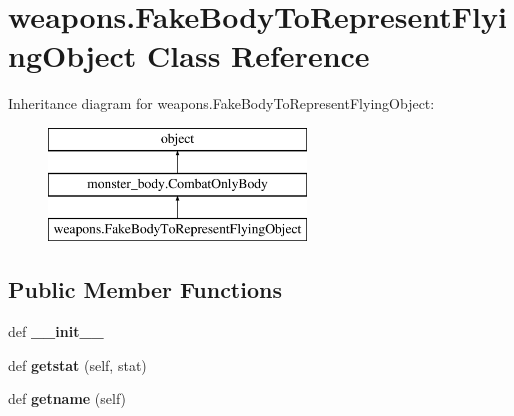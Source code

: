 \hypertarget{classweapons_1_1_fake_body_to_represent_flying_object}{}\section{weapons.\+Fake\+Body\+To\+Represent\+Flying\+Object Class Reference}
\label{classweapons_1_1_fake_body_to_represent_flying_object}
Inheritance diagram for weapons.\+Fake\+Body\+To\+Represent\+Flying\+Object\+:\begin{figure}[H]
\begin{center}
\leavevmode
\includegraphics[height=3.000000cm]{classweapons_1_1_fake_body_to_represent_flying_object}
\end{center}
\end{figure}
\subsection*{Public Member Functions}
\begin{DoxyCompactItemize}
\item 
\hypertarget{classweapons_1_1_fake_body_to_represent_flying_object_a4f1fcded2670a34e4d65643d57521f2b}{}def {\bfseries \+\_\+\+\_\+init\+\_\+\+\_\+}\label{classweapons_1_1_fake_body_to_represent_flying_object_a4f1fcded2670a34e4d65643d57521f2b}

\item 
\hypertarget{classweapons_1_1_fake_body_to_represent_flying_object_a4b01d4d783adc69efbd3db197714687f}{}def {\bfseries getstat} (self, stat)\label{classweapons_1_1_fake_body_to_represent_flying_object_a4b01d4d783adc69efbd3db197714687f}

\item 
\hypertarget{classweapons_1_1_fake_body_to_represent_flying_object_a91ec7025b0f845ffe285e7e540c17841}{}def {\bfseries getname} (self)\label{classweapons_1_1_fake_body_to_represent_flying_object_a91ec7025b0f845ffe285e7e540c17841}

\end{DoxyCompactItemize}
